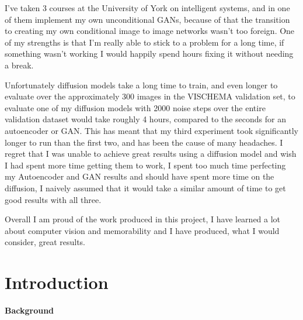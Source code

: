 \documentclass{UoYCSproject}
\begin{document}
I've taken 3 courses at the University of York on intelligent systems, and in one of them implement my own unconditional GANs, because of that the transition to creating my own conditional image to image networks wasn't too foreign. One of my strengths is that I'm really able to stick to a problem for a long time, if something wasn't working I would happily spend hours fixing it without needing a break.  

Unfortunately diffusion models take a long time to train, and even longer to evaluate over the approximately 300 images in the VISCHEMA validation set, to evaluate one of my diffusion models with 2000 noise steps over the entire validation dataset would take roughly 4 hours, compared to the seconds for an autoencoder or GAN. This has meant that my third experiment took significantly longer to run than the first two, and has been the cause of many headaches. I regret that I was unable to achieve great results using a diffusion model and wish I had spent more time getting them to work, I spent too much time perfecting my Autoencoder and GAN results and should have spent more time on the diffusion, I naively assumed that it would take a similar amount of time to get good results with all three.


Overall I am proud of the work produced in this project, I have learned a lot about computer vision and memorability and I have produced, what I would consider, great results.

\chapter{Introduction}


\textbf{Background}
\end{document}

